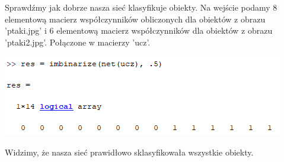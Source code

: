 \documentclass{article}
\begin{document}
	Sprawdźmy jak dobrze nasza sieć klasyfikuje obiekty. Na wejście podamy 8 elementową macierz współczynników obliczonych dla obiektów z obrazu 'ptaki.jpg' i 6 elementową macierz współczynników dla obiektów z obrazu 'ptaki2.jpg'. Połączone w macierzy 'ucz'.
	\begin{center}
		\includegraphics[width=\linewidth]{../../lab07/output.png}
	\end{center}
	Widzimy, że nasza sieć prawidłowo sklasyfikowała wszystkie obiekty.
	
\end{document}
